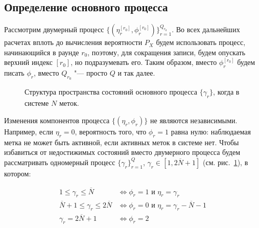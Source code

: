 \subsection{Определение основного процесса}

Рассмотрим двумерный процесс $\{ (\eta_r^{[r_0]}, \phi_r^{[r_0]}) \}_{r=1}^{Q_{r_0}}$. Во всех дальнейших расчетах вплоть до вычисления вероятности $P_X$ будем использовать процесс, начинающийся в раунде $r_0$, поэтому, для сокращения записи, будем опускать верхний индекс $[r_0]$, но подразумевать его. Таким образом, вместо $\phi_r^{[r_0]}$ будем писать $\phi_r$, вместо $Q_{r_0}$ "--- просто $Q$ и так далее.

\begin{figure}[htb]
  \caption{Структура пространства состояний основного процесса $\{\gamma_r\}$, когда в системе $N$ меток.}
  \label{fig:ch3_fg_structure}
\end{figure}

Изменения компонентов процесса $\{ (\eta_r, \phi_r) \}$ не являются независимыми. Например, если $\eta_r = 0$, вероятность того, что $\phi_r = 1$ равна нулю: наблюдаемая метка не может быть активной, если активных меток в системе нет. Чтобы избавиться от недостижимых состояний вместо двумерного процесса будем рассматривать одномерный процесс $\{ \gamma_r \}_{r=1}^Q$, $\gamma_r \in [1, 2\overline{N}+1]$ (см. рис.~\ref{fig:ch3_fg_structure}), в котором:

\begin{equation}\label{eq:ch3_gamma_process}
	\begin{aligned}
		1 \leqslant \gamma_r \leqslant \overline{N}                 &\Leftrightarrow \phi_r = 1 \text{ и } \eta_r = \gamma_r \\
		\overline{N} + 1 \leqslant \gamma_r \leqslant 2\overline{N} &\Leftrightarrow \phi_r = 0 \text{ и } \eta_r = \gamma_r - \overline{N} - 1\\
		\gamma_r = 2\overline{N}+1                                  &\Leftrightarrow \phi_r = 2
	\end{aligned}
\end{equation}

